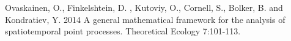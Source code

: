 \documentclass[8pt,a4paper]{article}
\begin{document}
\begin{thebibliography}{9}

 Ovaskainen, O., Finkelshtein, D. , Kutoviy, O., Cornell, S., Bolker, B. and  Kondratiev, Y. 2014 A general mathematical framework for the analysis of spatiotemporal point processes. Theoretical Ecology 7:101-113.

\end{thebibliography}
\end{document}

